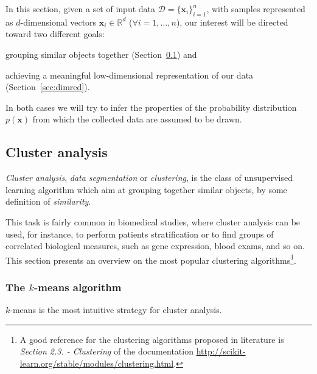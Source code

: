  In this section, given a set of input data $\mathcal{D}=\{\bm{x}_i\}_{i=1}^n$, with samples represented as $d$-dimensional vectors $\bm{x}_i \in \mathbb{R}^d$ ($\forall i=1,\dots,n$), our interest will be directed toward two different goals:
  \begin{enumerate*}[label=(\roman*)]
  	\item grouping similar objects together (Section~\ref{sec:clustering}) and
  	\item achieving a meaningful low-dimensional representation of our data (Section~\ref{sec:dimred}).
  \end{enumerate*}
  In both cases we will try to infer the properties of the probability distribution $p(\bm{x})$ from which the collected data are assumed to be drawn.
  
    \subsection{Cluster analysis} \label{sec:clustering}
    \textit{Cluster analysis}, \aka \textit{data segmentation} or \textit{clustering}, is the class of unsupervised learning algorithm which aim at grouping together similar objects, by some definition of \textit{similarity}.
        
    This task is fairly common in biomedical studies, where cluster analysis can be used, for instance, to perform patients stratification or to find groups of correlated biological measures, such as gene expression, blood exams, and so on. This section presents an overview on the most popular clustering algorithms\footnote{ A good reference for the clustering algorithms proposed in literature is \textit{Section 2.3. - Clustering} of the \sklearn documentation \url{http://scikit-learn.org/stable/modules/clustering.html}.}.

    \subsubsection{The $k$-means algorithm} \label{sec:k-means}
    $k$-means is the most intuitive strategy for cluster analysis.
    
